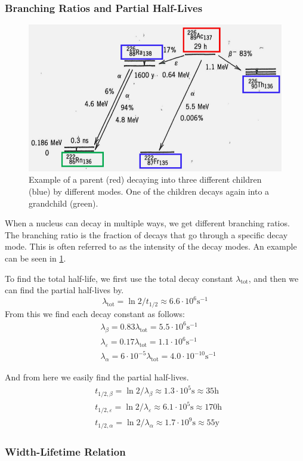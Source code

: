 \subsubsection{Branching Ratios and Partial Half-Lives}
\begin{figure}
\vspace{-4mm}
\centering
\includegraphics[width = .45\textwidth]{decay_branches.png}
\caption{Example of a parent (red) decaying into three different children (blue) by different modes. One of the children decays again into a grandchild (green).}
\label{fig: decay_branches}
\end{figure}
When a nucleus can decay in multiple ways, we get different branching ratios. The branching ratio is the fraction of decays that go through a specific decay mode. This is often referred to as the intensity of the decay modes. An example can be seen in \cref{fig: decay_branches}. 

To find the total half-life, we first use the total decay constant $λ_\text{tot}$, and then we can find the partial half-lives by. 
\begin{equation}
  λ_{\text{tot}} = \ln 2 / t_{1/2} ≈ 6.6 ⋅ 10^6 \text{s}^{-1}
\end{equation}
From this we find each decay constant as follows:
\begin{align}
  &λ_{β} = 0.83 λ_{\text{tot}}  = 5.5 ⋅ 10^6 \text{s}^{-1} \\
  &λ_{ε} = 0.17 λ_{\text{tot}}  = 1.1 ⋅ 10^6 \text{s}^{-1} \\
  &λ_{α} = 6 ⋅ 10^{-5} λ_{\text{tot}}  = 4.0 ⋅ 10^{-10} \text{s}^{-1}
\end{align}


And from here we easily find the partial half-lives.  
\begin{align}
  &t_{1/2,β} = \ln 2 / λ_{β} ≈ 1.3 ⋅ 10^{5} \text{s} ≈ 35 \text{h} \\
  &t_{1/2,ε} = \ln 2 / λ_{ε} ≈ 6.1 ⋅ 10^{5} \text{s} ≈ 170 \text{h} \\
  &t_{1/2,α} = \ln 2 / λ_{α} ≈ 1.7 ⋅ 10^{9} \text{s} ≈ 55 \text{y}
\end{align}
\subsubsection{Width-Lifetime Relation}
